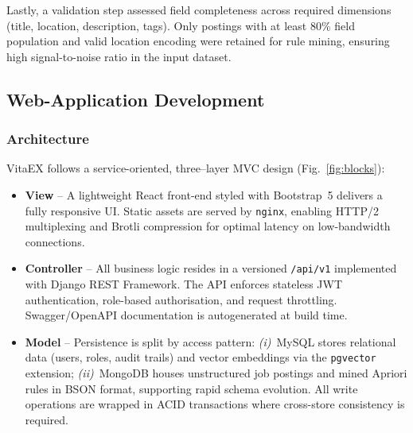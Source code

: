 \documentclass{svproc} %
\begin{document}
	Lastly, a validation step assessed field completeness across required dimensions (title, location, description, tags). Only postings with at least 80\% field population and valid location encoding were retained for rule mining, ensuring high signal-to-noise ratio in the input dataset.
	
	
	\subsection{Web-Application Development}
	\label{ssec:web_dev}
	
	\subsubsection{Architecture}
	VitaEX follows a service-oriented, three–layer MVC design (Fig.~\ref{fig:blocks}):
	\begin{itemize}
		\item \textbf{View} – A lightweight React front-end styled with Bootstrap~5 delivers a fully
		responsive UI.  Static assets are served by \texttt{nginx}, enabling HTTP/2
		multiplexing and Brotli compression for optimal latency on low-bandwidth connections.
		\item \textbf{Controller} – All business logic resides in a versioned \texttt{/api/v1}
		implemented with Django REST Framework.  The API enforces stateless JWT
		authentication, role-based authorisation, and request throttling.  Swagger/OpenAPI
		documentation is autogenerated at build time.
		\item \textbf{Model} – Persistence is split by access pattern:  
		\emph{(i)}~MySQL stores relational data (users, roles, audit trails) and vector
		embeddings via the \texttt{pgvector} extension;  
		\emph{(ii)}~MongoDB houses unstructured job postings and mined Apriori rules in BSON
		format, supporting rapid schema evolution.  
		All write operations are wrapped in ACID transactions where cross-store consistency
		is required.
	\end{itemize}
	
	
\end{document}

